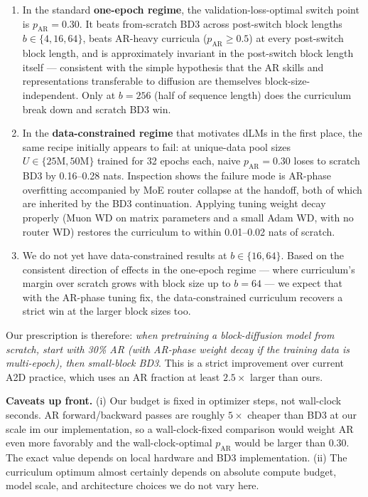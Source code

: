 \documentclass{article}
\newcommand{\pAR}{p_{\mathrm{AR}}}
\begin{document}
\begin{enumerate}
\item In the standard \textbf{one-epoch regime}, the validation-loss-optimal switch point is $\pAR{=}0.30$. It beats from-scratch BD3 across post-switch block lengths $b \in \{4, 16, 64\}$, beats AR-heavy curricula ($\pAR \ge 0.5$) at every post-switch block length, and is approximately invariant in the post-switch block length itself --- consistent with the simple hypothesis that the AR skills and representations transferable to diffusion are themselves block-size-independent. Only at $b{=}256$ (half of sequence length) does the curriculum break down and scratch BD3 win.
\item In the \textbf{data-constrained regime} that motivates dLMs in the first place, the same recipe initially appears to fail: at unique-data pool sizes $U \in \{25\text{M}, 50\text{M}\}$ trained for 32 epochs each, naive $\pAR{=}0.30$ loses to scratch BD3 by 0.16--0.28 nats. Inspection shows the failure mode is AR-phase overfitting accompanied by MoE router collapse at the handoff, both of which are inherited by the BD3 continuation. Applying tuning weight decay properly (Muon WD on matrix parameters and a small Adam WD, with no router WD) restores the curriculum to within 0.01--0.02 nats of scratch.
\item We do not yet have data-constrained results at $b \in \{16, 64\}$. Based on the consistent direction of effects in the one-epoch regime --- where curriculum's margin over scratch grows with block size up to $b{=}64$ --- we expect that with the AR-phase tuning fix, the data-constrained curriculum recovers a strict win at the larger block sizes too.
\end{enumerate}

Our prescription is therefore: \emph{when pretraining a block-diffusion model from scratch, start with 30\% AR (with AR-phase weight decay if the training data is multi-epoch), then small-block BD3}. This is a strict improvement over current A2D practice, which uses an AR fraction at least $2.5\times$ larger than ours.

\textbf{Caveats up front.} (i) Our budget is fixed in optimizer steps, not wall-clock seconds. AR forward/backward passes are roughly $5\times$ cheaper than BD3 at our scale im our implementation, so a wall-clock-fixed comparison would weight AR even more favorably and the wall-clock-optimal $\pAR$ would be larger than $0.30$. The exact value depends on local hardware and BD3 implementation. (ii) The curriculum optimum almost certainly depends on absolute compute budget, model scale, and architecture choices we do not vary here.
\end{document}
